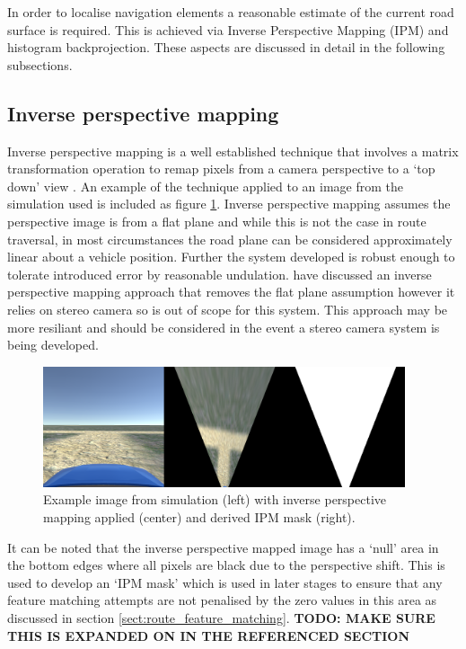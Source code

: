 \documentclass[]{aiaa-tc}%
\begin{document}
In order to localise navigation elements a reasonable estimate of the current road surface is required. This is achieved via Inverse Perspective Mapping (IPM) and histogram backprojection. These aspects are discussed in detail in the following subsections.

\subsection{Inverse perspective mapping}

Inverse perspective mapping is a well established technique that involves a matrix transformation operation to remap pixels from a camera perspective to a `top down' view \citep{compVisionTextbook}. An example of the technique applied to an image from the simulation used is included as figure \ref{f:ipmSim}. Inverse perspective mapping assumes the perspective image is from a flat plane \citep{ipmForLaneTracking} and while this is not the case in route traversal, in most circumstances the road plane can be considered approximately linear about a vehicle position. Further the system developed is robust enough to tolerate introduced error by reasonable undulation. \citep{extendedIPM} have discussed an inverse perspective mapping approach that removes the flat plane assumption however it relies on stereo camera so is out of scope for this system. This approach may be more resiliant and should be considered in the event a stereo camera system is being developed.


\begin{figure}
	\centering
	\includegraphics[width=0.95\textwidth]{RoadDetection/ipmSim.png}
	\caption{Example image from simulation (left) with inverse perspective mapping applied (center) and derived IPM mask (right).}
	\label{f:ipmSim}
\end{figure}

It can be noted that the inverse perspective mapped image has a `null' area in the bottom edges where all pixels are black due to the perspective shift. This is used to develop an `IPM mask' which is used in later stages to ensure that any feature matching attempts are not penalised by the zero values in this area as discussed in section \ref{sect:route_feature_matching}. \textbf{TODO: MAKE SURE THIS IS EXPANDED ON IN THE REFERENCED SECTION}
\end{document}
